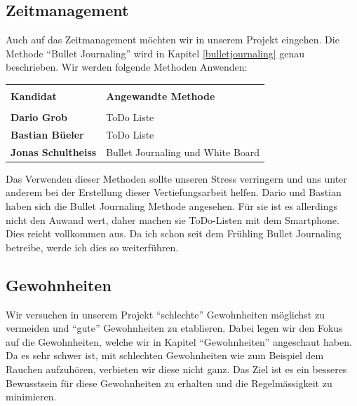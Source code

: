 \subsection{Zeitmanagement}
\authortoc{\jonas}{\subsectionident}
Auch auf das Zeitmanagement möchten wir in unserem Projekt eingehen. Die Methode “Bullet Journaling” wird in Kapitel \ref{bulletjournaling} genau beschrieben. Wir werden folgende Methoden Anwenden:
\newline
\begin{table}[htp]
  \begin{tabularx}{\textwidth}{l X}\hline \\
    \textbf{Kandidat} & \textbf{Angewandte Methode}  \\\hline \\
    \textbf{Dario Grob} & ToDo Liste \\
    \textbf{Bastian Büeler} & ToDo Liste \\
    \textbf{Jonas Schultheiss} & Bullet Journaling und White Board
    \\\hline
  \end{tabularx}
\end{table}
\newline
Das Verwenden dieser Methoden sollte unseren Stress verringern und uns unter anderem bei der Erstellung dieser Vertiefungsarbeit helfen. Dario und Bastian haben sich die Bullet Journaling Methode angesehen. Für sie ist es allerdings nicht den Auwand wert, daher machen sie ToDo-Listen mit dem Smartphone. Dies reicht vollkommen aus. Da ich schon seit dem Frühling Bullet Journaling betreibe, werde ich dies so weiterführen.
\subsection{Gewohnheiten}
\authortoc{\dario}{\subsectionident}
Wir versuchen in unserem Projekt “schlechte” Gewohnheiten möglichst zu vermeiden und “gute” Gewohnheiten zu etablieren. Dabei legen wir den Fokus auf die Gewohnheiten, welche wir in Kapitel “Gewohnheiten” angeschaut haben.
\newline
Da es sehr schwer ist, mit schlechten Gewohnheiten wie zum Beispiel dem Rauchen aufzuhören, verbieten wir diese nicht ganz. Das Ziel ist es ein besseres Bewusstsein für diese Gewohnheiten zu erhalten und die Regelmässigkeit zu minimieren.
